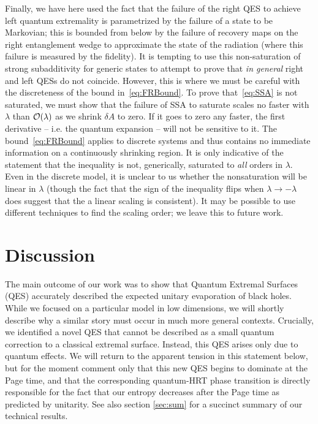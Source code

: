 \documentclass[12pt]{article}
\begin{document}
Finally, we have here used the fact that the failure of the right QES to achieve left quantum extremality is parametrized by the failure of a state to be Markovian; this is bounded from below by the failure of recovery maps on the right entanglement wedge to approximate the state of the radiation (where this failure is measured by the fidelity). It is tempting to use this non-saturation of strong subadditivity for generic states to attempt to prove that \textit{in general} right and left QESs do not coincide. However, this is where we must be careful with the discreteness of the bound in~\eqref{eq:FRBound}. To prove that~\eqref{eq:SSA} is not saturated, we must show that the failure of SSA to saturate scales no faster with $\lambda$ than $\cal{O}(\lambda)$ as we shrink $\delta A$ to zero. If it goes to zero any faster, the first derivative -- i.e. the quantum expansion -- will not be sensitive to it. The bound~\eqref{eq:FRBound} applies to discrete systems and thus contains no immediate information on a continuously shrinking region. It is only indicative of the statement that the inequality is not, generically, saturated to \textit{all} orders in $\lambda$. Even in the discrete model, it is unclear to us whether the nonsaturation will be linear in $\lambda$ (though the fact that the sign of the inequality flips when $\lambda \rightarrow -\lambda$ does suggest that the a linear scaling is consistent). It may be possible to use different techniques to find the scaling order; we leave this to future work.



\section{Discussion}
\label{sec:disc}

The main outcome of our work was to show that Quantum Extremal Surfaces (QES) accurately described the expected unitary evaporation of black holes. While we focused on a particular model in low dimensions, we will shortly describe why a similar story must occur in much more general contexts.  Crucially, we identified a novel QES that cannot be described as a small quantum correction to a classical extremal surface.  Instead, this QES arises only due to quantum effects. We will return to the apparent tension in this statement below, but for the moment comment only that this new QES begins to dominate at the Page time, and that the corresponding quantum-HRT phase transition is directly responsible for the fact that our entropy decreases after the Page time as predicted by unitarity. See also section \ref{sec:sum} for a succinct summary of our technical results.
\end{document}
